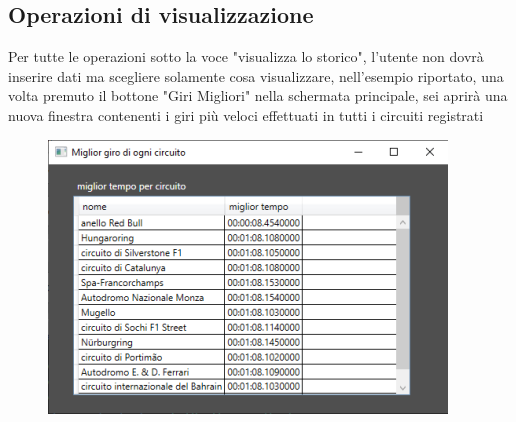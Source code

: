 \documentclass[a4paper,12pt]{report}
\begin{document}
			\subsection{Operazioni di visualizzazione}
				Per tutte le operazioni sotto la voce "visualizza lo storico", l'utente non dovrà inserire dati ma scegliere solamente
				cosa visualizzare, nell'esempio riportato, una volta premuto il bottone "Giri Migliori" nella schermata principale, sei aprirà una nuova
				finestra contenenti i giri più veloci effettuati in tutti i circuiti registrati
				\begin{figure}[htbp]
					\centering
					\includegraphics[scale=1]{copies/risultati.png}
				\end{figure}
\end{document}
